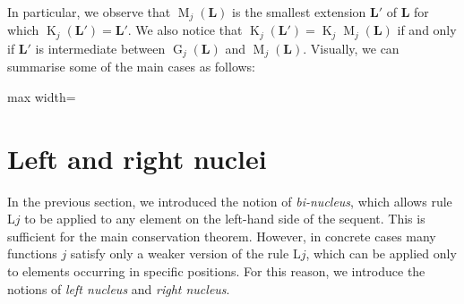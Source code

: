 \documentclass[runningheads]{llncs}
\DeclareMathOperator{\Glivenko}{G}
\DeclareMathOperator{\Kleisli}{K}
\DeclareMathOperator{\Maximal}{M}
\begin{document}
In particular, we observe that $\Maximal_j(\mathbf{L})$ is the smallest extension $\mathbf{L}'$ of $\mathbf{L}$ for which $\Kleisli_j(\mathbf{L}') = \mathbf{L}'$. We also notice that $\Kleisli_j(\mathbf{L}') = \Kleisli_j\Maximal_j(\mathbf{L})$ if and only if $\mathbf{L}'$ is intermediate between $\Glivenko_j(\mathbf{L})$ and $\Maximal_j(\mathbf{L})$.
Visually, we can summarise some of the main cases as follows:
\vspace{-10pt}
\begin{center}
\begin{adjustbox}{max width=\textwidth}
\end{adjustbox}
\end{center}

\section{Left and right nuclei}\label{sec-nuclei}

In the previous section, we introduced the notion of \emph{bi-nucleus}, which allows rule \textnormal{L$j$} to be applied to any element on the left-hand side of the sequent. This is sufficient for the main conservation theorem. However, in concrete cases many functions $j$ satisfy only a weaker version of the rule \textnormal{L$j$}, which can be applied only to elements occurring in specific positions. For this reason, we introduce the notions of \emph{left nucleus} and \emph{right nucleus}.
\end{document}
